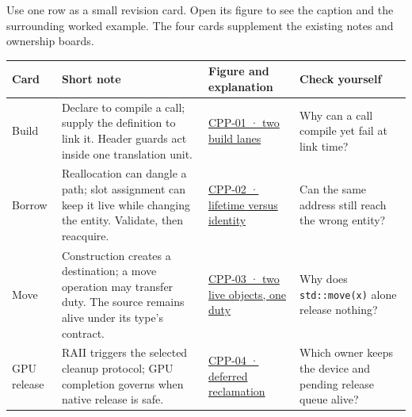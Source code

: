 Use one row as a small revision card. Open its figure to see the caption and the surrounding worked example. The four cards supplement the existing notes and ownership boards.

{\def\LTcaptype{none} %
\begin{longtable}[]{@{}
  >{\raggedright\arraybackslash}p{}
  >{\raggedright\arraybackslash}p{}
  >{\raggedright\arraybackslash}p{}
  >{\raggedright\arraybackslash}p{}@{}}
\toprule\noalign{}
\begin{minipage}[b]{\linewidth}\raggedright
Card
\end{minipage} & \begin{minipage}[b]{\linewidth}\raggedright
Short note
\end{minipage} & \begin{minipage}[b]{\linewidth}\raggedright
Figure and explanation
\end{minipage} & \begin{minipage}[b]{\linewidth}\raggedright
Check yourself
\end{minipage} \\
\midrule\noalign{}
\endhead
\bottomrule\noalign{}
\endlastfoot
Build & Declare to compile a call; supply the definition to link it. Header guards act inside one translation unit. & \hyperref[01-foundations-i-ch002-figure-cpp-01---two-build-lanes-meet-at-the-linker]{CPP-01 · two build lanes} & Why can a call compile yet fail at link time? \\
Borrow & Reallocation can dangle a path; slot assignment can keep it live while changing the entity. Validate, then reacquire. & \hyperref[01-foundations-i-ch003-figure-cpp-02---a-borrow-can-fail-in-two-different-ways]{CPP-02 · lifetime versus identity} & Can the same address still reach the wrong entity? \\
Move & Construction creates a destination; a move operation may transfer duty. The source remains alive under its type's contract. & \hyperref[01-foundations-i-ch003-figure-cpp-03---move-the-duty-keep-both-object-lifetimes]{CPP-03 · two live objects, one duty} & Why does \texttt{std::move(x)} alone release nothing? \\
GPU release & RAII triggers the selected cleanup protocol; GPU completion governs when native release is safe. & \hyperref[01-foundations-i-ch004-figure-cpp-04---cpu-cleanup-can-precede-gpu-reclamation]{CPP-04 · deferred reclamation} & Which owner keeps the device and pending release queue alive? \\
\end{longtable}
}

